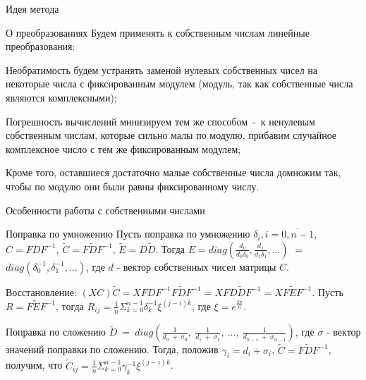 \documentclass[10pt]{beamer}
\newcounter{qcounter}
\begin{document}
\begin{frame}{Идея метода}

\begin{block}{О преобразованиях}
Будем применять к собственным числам линейные преобразования:
    \begin{list}{)~}{}
        \item Необратимость будем устранять заменой нулевых собственных чисел на некоторые числа с фиксированным модулем (модуль, так как собственные числа являются комплексными);
        \item Погрешность вычислений минизируем тем же способом~-~к ненулевым собственным числам, которые сильно малы по модулю, прибавим случайное комплексное число с тем же фиксированным модулем;
        \item Кроме того, оставшиеся достаточно малые собственные числа домножим так, чтобы по модулю они были равны фиксированному числу.
    \end{list}
\end{block}

\end{frame}


\begin{frame}{Особенности работы с собственными числами}

\begin{block}{Поправка по умножению}
Пусть поправка по умножению $\delta_i, i = \overline{0, n-1}$, $C = FDF^{-1}$, $\tilde{C} = F\tilde{D}F^{-1}$, $\tilde{E} = D\tilde{D}$. Тогда $E = diag(\frac{d_0}{d_0\delta_0}, \frac{d_1}{d_1\delta_1}, ...)$ $=$ $diag(\delta_0^{-1}, \delta_1^{-1}, ...)$, где $d$ - вектор собственных чисел матрицы $C$.


Восстановление: $(XC)\tilde{C} = XFDF^{-1}F\tilde{D}F^{-1} = XFD\tilde{D}F^{-1} = XF\tilde{E}F^{-1}$. Пусть $R = F\tilde{E}F^{-1}$, тогда $R_{ij} = \frac{1}{n}\Sigma_{k=0}^{n-1} \delta_k^{-1} \xi^{(j-i)k}$, где $\xi = e^{\frac{2\pi}{n}}$.
\end{block}


\begin{block}{Поправка по сложению}
$\tilde{D}~=~diag(\frac{1}{d_0~+~\sigma_0},~\frac{1}{d_1~+~\sigma_1},~...,~\frac{1}{d_{n-1}~+~\sigma_{n-1}})$, где $\sigma$ - вектор значений поправки по сложению. Тогда, положив $\gamma_i = d_i + \sigma_i$, $\tilde{C} = F\tilde{D}F^{-1}$, получим, что $\tilde{C}_{ij} = \frac{1}{n}\Sigma_{k=0}^{n-1} \gamma_k^{-1} \xi^{(j-i)k}$.
\end{block}

\end{frame}
\end{document}
